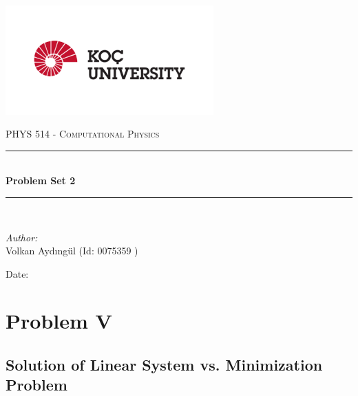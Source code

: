 \documentclass[letterpaper,12pt]{article}
\newcommand{\reporttitle}{Problem Set 2}
\newcommand{\reportauthor}{ Volkan Aydıngül (Id: 0075359 )\\
                            }
\begin{document}
\begin{titlepage}
\newcommand{\HRule}{\rule{\linewidth}{0.5mm}}
\begin{center} %
\includegraphics[width = 8cm]{figures/koc_logo.png}

\textsc{\Large PHYS 514 - Computational Physics}\\[1.5cm] 
\HRule \\[0.6cm]
{ \huge \bfseries \reporttitle}\\ %
\HRule \\[1.5cm]
\end{center}
\vspace{2cm}
\begin{flushleft} \large
\textit{Author:}\\
\reportauthor%
\end{flushleft}
\vspace{2cm}
\makeatletter
Date: \@date 
\vfill %
\makeatother
\end{titlepage}




\tableofcontents
\newpage






\section{Problem V}
\subsection{Solution of Linear System vs. Minimization Problem}
\end{document}
